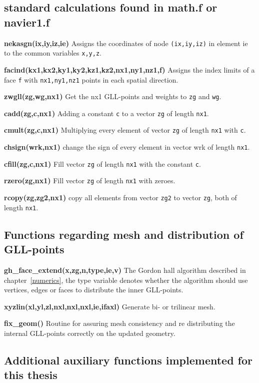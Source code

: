\subsection{standard calculations found in math.f or navier1.f}

\textbf{nekasgn(ix,iy,iz,ie) } Assigns the coordinates of node 
    \verb|(ix,iy,iz)| in element ie to the common variables \verb|x,y,z|.

\textbf{facind(kx1,kx2,ky1,ky2,kz1,kz2,nx1,ny1,nz1,f) } 
Assigns the index limits of a face \verb|f| with \verb|nx1,ny1,nz1| points in each spatial direction.

\textbf{zwgll(zg,wg,nx1)} Get the nx1 GLL-points and weights to \verb|zg| and \verb|wg|.

\textbf{cadd(zg,c,nx1)} Adding a constant \verb|c| to a vector \verb|zg| of length \verb|nx1|.

\textbf{cmult(zg,c,nx1)} Multiplying every element of vector \verb|zg| of length \verb|nx1| with \verb|c|.

\textbf{chsign(wrk,nx1)} change the sign of every element in vector wrk of length \verb|nx1|.

\textbf{cfill(zg,c,nx1)}  Fill vector \verb|zg| of length \verb|nx1| with the constant \verb|c|.

\textbf{rzero(zg,nx1) } Fill vector \verb|zg| of length \verb|nx1| with zeroes.

\textbf{rcopy(zg,zg2,nx1) } copy all elements from vector \verb|zg2| to vector \verb|zg|, both of length \verb|nx1|.

\subsection{Functions regarding mesh and distribution of GLL-points}

\textbf{gh\_face\_extend(x,zg,n,type,ie,v)}  The Gordon hall algorithm described in chapter~\ref{numerics}, the type variable denotes whether the 
algorithm should use vertices, edges or faces to distribute the inner GLL-points. 

\textbf{xyzlin(xl,yl,zl,nxl,nxl,nxl,ie,ifaxl)} Generate bi- or trilinear mesh.

\textbf{fix\_geom()} Routine for assuring mesh consistency and re distributing the internal  GLL-points correctly on the updated geometry.

\subsection{Additional auxiliary functions implemented for this thesis}\label{surfaceprojection}

